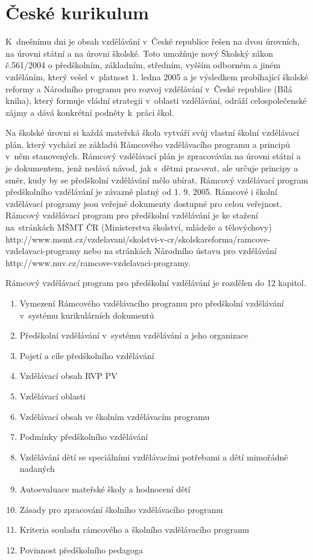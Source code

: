	\section{České kurikulum}

		K dnešnímu dni je obsah vzdělávání v České republice řešen na dvou úrovních, na úrovni státní a na úrovni školské. Toto umožňuje nový Školský zákon č.561/2004 o předškolním, základním, středním, vyšším odborném a jiném vzděláním, který vešel v platnost 1. ledna 2005 a je výsledkem probíhající školské reformy a Národního programu pro rozvoj vzdělávání v České republice (Bílá kniha), který formuje vládní strategii v oblasti vzdělávání, odráží celospolečenské zájmy a dává konkrétní podněty k práci škol.

		Na školské úrovni si každá mateřská škola vytváří svůj vlastní školní vzdělávací plán, který vychází ze základů Rámcového vzdělávacího programu a principů v něm stanovených. Rámcový vzdělávací plán je zpracováván na úrovni státní a je dokumentem, jenž nedává návod, jak s dětmi pracovat, ale určuje principy a směr, kudy by se předškolní vzdělávání mělo ubírat. Rámcový vzdělávací program předškolního vzdělávání je závazně platný od 1. 9. 2005.
		Rámcové i školní vzdělávací programy jsou veřejné dokumenty dostupné pro celou veřejnost. Rámcový vzdělávací program pro předškolní vzdělávání je ke stažení na stránkách MŠMT ČR (Ministerstva školství, mládeže a tělovýchovy) http://www.msmt.cz/vzdelavani/skolstvi-v-cr/skolskareforma/ramcove-vzdelavaci-programy nebo na stránkách Národního ústavu pro vzdělávání http://www.nuv.cz/ramcove-vzdelavaci-programy.

		Rámcový vzdělávací program pro předškolní vzdělávání je rozdělen do 12 kapitol.
		\begin{enumerate}[1.]
		\item Vymezení Rámcového vzdělávacího programu pro předškolní vzdělávání v systému kurikulárních dokumentů
		\item Předškolní vzdělávání v systému vzdělávání a jeho organizace
		\item Pojetí a cíle předškolního vzdělávání
		\item Vzdělávací obsah RVP PV
		\item Vzdělávací oblasti
		\item Vzdělávací obsah ve školním vzdělávacím programu 
		\item Podmínky předškolního vzdělávání
		\item Vzdělávání dětí se speciálními vzdělávacími potřebami a dětí mimořádně nadaných
		\item Autoevaluace mateřské školy a hodnocení dětí
		\item Zásady pro zpracování školního vzdělávacího programu
		\item Kriteria souladu rámcového a školního vzdělávacího programu
		\item Povinnost předškolního pedagoga
		\end{enumerate}

